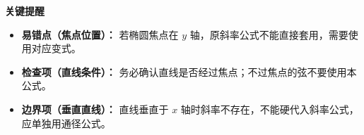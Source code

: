 \begin{summarybox}
    \medskip


\textbf{\textcolor{CSummary}{关键提醒}}

	\begin{itemize}[leftmargin=*, itemsep=0.5em, topsep=0.4em]
		\item \textbf{易错点（焦点位置）：}
		      若椭圆焦点在 $y$ 轴，原斜率公式不能直接套用，需要使用对应变式。

		\item \textbf{检查项（直线条件）：}
		      务必确认直线是否经过焦点；不过焦点的弦不要使用本公式。

		\item \textbf{边界项（垂直直线）：}
		      直线垂直于 $x$ 轴时斜率不存在，不能硬代入斜率公式，应单独用通径公式。
	\end{itemize}
\end{summarybox}